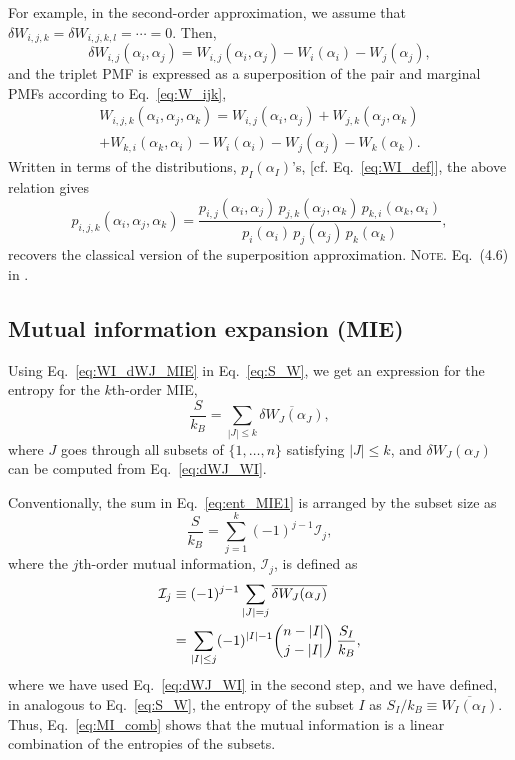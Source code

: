 \documentclass[reprint, superscriptaddress]{revtex4-1}
\newcommand{\note}[1]{{\color{DarkGreen}\footnotesize \textsc{Note.} #1}}
\newcommand{\MI}{\mathcal I} %
\begin{document}
For example,
in the second-order approximation,
we assume that
$\delta W_{i, j, k} = \delta W_{i,j,k, l} = \cdots = 0$.
%
Then,
$$\delta W_{i, j}(\alpha_i, \alpha_j)
= W_{i,j}(\alpha_i, \alpha_j) - W_i(\alpha_i) - W_j(\alpha_j),$$
and the triplet PMF is expressed as a superposition
of the pair and marginal PMFs according to Eq.~\eqref{eq:W_ijk},
\begin{align*}
W_{i,j,k}(\alpha_i, \alpha_j, \alpha_k)
=
W_{i,j}(\alpha_i, \alpha_j) + W_{j,k}(\alpha_j, \alpha_k)\\
  + W_{k,i}(\alpha_k, \alpha_i)
  - W_i(\alpha_i) - W_j(\alpha_j) - W_k(\alpha_k)
.
\end{align*}
%
Written in terms of the distributions, $p_I(\alpha_I)$'s,
[cf. Eq.~\eqref{eq:WI_def}], the above relation gives
%
$$
p_{i,j,k}(\alpha_i, \alpha_j, \alpha_k)
=
\frac{ p_{i,j}(\alpha_i, \alpha_j) \, p_{j,k}(\alpha_j, \alpha_k) \, p_{k,i}(\alpha_k, \alpha_i) }{ p_i(\alpha_i) \, p_j(\alpha_j) \, p_k(\alpha_k) }
,
$$
recovers the classical version of the superposition approximation\cite{kirkwood1935, born1946}.
\note{Eq.~(4.6) in \cite{born1946}.}

\subsection{Mutual information expansion (MIE)}


Using Eq.~\eqref{eq:WI_dWJ_MIE} in Eq.~\eqref{eq:S_W},
we get an expression for the entropy for the $k$th-order MIE,
\begin{equation}
  \frac{S}{k_B}
  =
  \sum_{|J| \le k} \overline{ \delta W_J(\alpha_J) },
  \label{eq:ent_MIE1}
\end{equation}
where $J$ goes through all subsets of $\{1, \dots, n\}$ satisfying $|J| \le k$,
and $\delta W_J(\alpha_J)$ can be computed from Eq.~\eqref{eq:dWJ_WI}.

Conventionally, the sum in Eq.~\eqref{eq:ent_MIE1}
is arranged by the subset size as
\begin{equation}
  \frac{S}{k_B}
  =
  \sum_{j = 1}^k (-1)^{j-1} \MI_j
  ,
  \label{eq:S_MIE}
\end{equation}
%
where the $j$th-order mutual information, $\MI_j$, is defined as
\begin{align}
  \MI_j
  &\equiv (-1)^{j-1} \sum_{|J| = j} \overline{ \delta W_J(\alpha_J) }
  \notag \\
  &=
  \sum_{ |I| \le j }
  (-1)^{|I| - 1}
  {n - |I| \choose j - |I|}
  \, \frac{S_I}{k_B}
  ,
  \label{eq:MI_comb}
\end{align}
where we have used Eq.~\eqref{eq:dWJ_WI}
in the second step,
and we have defined, in analogous to Eq.~\eqref{eq:S_W},
the entropy of the subset $I$ as
$S_I / k_B \equiv \overline{ W_I(\alpha_I) }$.
%
Thus, Eq.~\eqref{eq:MI_comb} shows that
the mutual information is a linear combination of
the entropies of the subsets.
\end{document}
